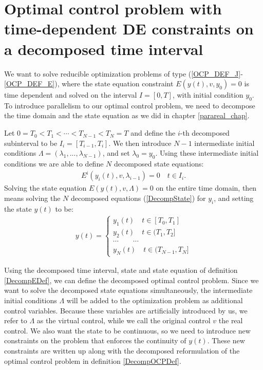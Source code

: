 \section{Optimal control problem with time-dependent DE constraints on a decomposed time interval} \label{decomp_sec}
We want to solve reducible optimization problems of type (\ref{OCP_DEF_J}-\ref{OCP_DEF_E}), where the state equation constraint $E(y(t),v,y_0)=0$ is time dependent and solved on the interval $I=[0,T]$, with initial condition $y_0$. To introduce parallelism to our optimal control problem, we need to decompose the time domain and the state equation as we did in chapter \ref{parareal_chap}. 
\begin{definition} \label{DecompEDef}
Let $0=T_0<T_1<\cdots<T_{N-1}<T_N=T$ and define the $i$-th decomposed subinterval to be $I_i=[T_{i-1},T_i]$. We then introduce $N-1$ intermediate initial conditions $\Lambda=(\lambda_1,...,\lambda_{N-1})$, and set $\lambda_0=y_0$. Using these intermediate initial conditions we are able to define $N$ decomposed state equations:
\begin{align}
E^i(y_i(t),v,\lambda_{i-1})= 0 \quad t\in I_i. \label{DecompState}
\end{align} 
Solving the state equation $E(y(t),v,\Lambda)=0$ on the entire time domain, then means solving the $N$ decomposed equations (\ref{DecompState}) for $y_i$, and setting the state $y(t)$ to be:
\begin{align}
 y(t)=\left\{
     \begin{array}{lr}
		y_1(t)\quad t\in [T_0,T_1] \\
		y_2(t)\quad t\in(T_1,T_2] \\
		\cdots \quad\quad\cdots\\
		y_N(t)\quad t\in(T_{N-1},T_N]
	\end{array}
   \right.	\label{GatherState}
\end{align}
\end{definition}
\noindent
Using the decomposed time interval, state and state equation of definition \ref{DecompEDef}, we can define the decomposed optimal control problem. Since we want to solve the decomposed state equations simultaneously, the intermediate initial conditions $\Lambda$ will be added to the optimization problem as additional control variables. Because these variables are artificially introduced by us, we refer to $\Lambda$ as the virtual control, while we call the original control $v$ the real control. We also want the state to be continuous, so we need to introduce new constraints on the problem that enforces the continuity of $y(t)$. These new constraints are written up along with the decomposed reformulation of the optimal control problem in definition \ref{DecompOCPDef}.
